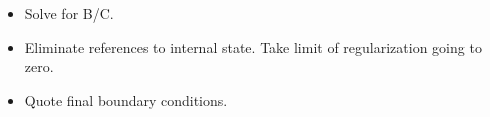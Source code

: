 \begin{itemize}
  \item Solve for B/C.
  \item Eliminate references to internal state.  Take limit of regularization going to zero.
  \item {Quote final boundary conditions.}

\end{itemize}

